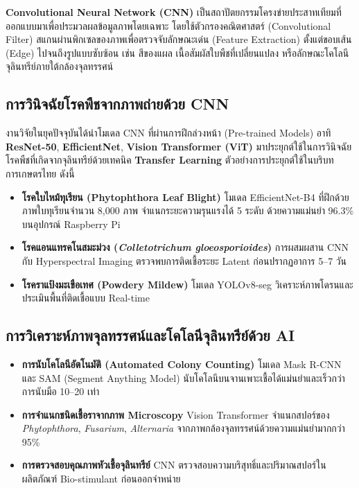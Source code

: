 \textbf{Convolutional Neural Network (CNN)} เป็นสถาปัตยกรรมโครงข่ายประสาทเทียมที่ออกแบบมาเพื่อประมวลผลข้อมูลภาพโดยเฉพาะ โดยใช้ตัวกรองคณิตศาสตร์ (Convolutional Filter) สแกนผ่านพิกเซลของภาพเพื่อตรวจจับลักษณะเด่น (Feature Extraction) ตั้งแต่ขอบเส้น (Edge) ไปจนถึงรูปแบบซับซ้อน เช่น สีของแผล เนื้อสัมผัสใบพืชที่เปลี่ยนแปลง หรือลักษณะโคโลนีจุลินทรีย์ภายใต้กล้องจุลทรรศน์

\subsection{การวินิจฉัยโรคพืชจากภาพถ่ายด้วย CNN}

งานวิจัยในยุคปัจจุบันได้นำโมเดล CNN ที่ผ่านการฝึกล่วงหน้า (Pre-trained Models) อาทิ \textbf{ResNet-50}, \textbf{EfficientNet}, \textbf{Vision Transformer (ViT)} มาประยุกต์ใช้ในการวินิจฉัยโรคพืชที่เกิดจากจุลินทรีย์ด้วยเทคนิค \textbf{Transfer Learning} ตัวอย่างการประยุกต์ใช้ในบริบทการเกษตรไทย ดังนี้
\begin{itemize}
    \item \textbf{โรคใบไหม้ทุเรียน (Phytophthora Leaf Blight)} โมเดล EfficientNet-B4 ที่ฝึกด้วยภาพใบทุเรียนจำนวน 8{,}000 ภาพ จำแนกระยะความรุนแรงได้ 5 ระดับ ด้วยความแม่นยำ 96.3\% บนอุปกรณ์ Raspberry Pi
    \item \textbf{โรคแอนแทรคโนสมะม่วง (\textit{Colletotrichum gloeosporioides})} การผสมผสาน CNN กับ Hyperspectral Imaging ตรวจพบการติดเชื้อระยะ Latent ก่อนปรากฏอาการ 5--7 วัน
    \item \textbf{โรคราแป้งมะเขือเทศ (Powdery Mildew)} โมเดล YOLOv8-seg วิเคราะห์ภาพโดรนและประเมินพื้นที่ติดเชื้อแบบ Real-time
\end{itemize}

\subsection{การวิเคราะห์ภาพจุลทรรศน์และโคโลนีจุลินทรีย์ด้วย AI}

\begin{itemize}
    \item \textbf{การนับโคโลนีอัตโนมัติ (Automated Colony Counting)} โมเดล Mask R-CNN และ SAM (Segment Anything Model) นับโคโลนีบนจานเพาะเชื้อได้แม่นยำและเร็วกว่าการนับมือ 10--20 เท่า
    \item \textbf{การจำแนกชนิดเชื้อราจากภาพ Microscopy} Vision Transformer จำแนกสปอร์ของ \textit{Phytophthora}, \textit{Fusarium}, \textit{Alternaria} จากภาพกล้องจุลทรรศน์ด้วยความแม่นยำมากกว่า 95\%
    \item \textbf{การตรวจสอบคุณภาพหัวเชื้อจุลินทรีย์} CNN ตรวจสอบความบริสุทธิ์และปริมาณสปอร์ในผลิตภัณฑ์ Bio-stimulant ก่อนออกจำหน่าย
\end{itemize}

